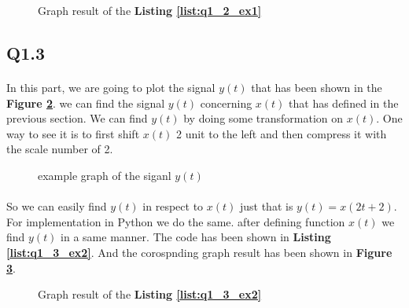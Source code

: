 \begin{figure}[H]
  \centering
  \scalebox{0.4}{}
  \caption{Graph result of the \textbf{Listing \ref{list:q1_2_ex1}}}
  \label{fig:Q1-2-ex1}
\end{figure}

\subsection{Q1.3}

\paragraph{}In this part, we are going to plot the 
signal $y(t)$ that has been shown in the 
\textbf{Figure \ref{fig:ex2}}. we can find the signal 
$y(t)$ concerning $x(t)$ that has defined in the 
previous section. We can find $y(t)$ by doing some 
transformation on $x(t)$. One way to see it is to 
first shift $x(t)$ 2 unit to the left and then 
compress it with the scale number of 2.

\begin{figure}[H]
 \centering
{}
\caption{example graph of the siganl $y(t)$}
  \label{fig:ex2}
\end{figure}
\paragraph{}
So we can easily find $y(t)$ in respect to $x(t)$ 
just that is $y(t) = x(2t+2)$. For implementation 
in Python we do the same. after defining function 
$x(t)$ we find $y(t)$ in a same manner. The code 
has been shown in \textbf{Listing \ref{list:q1_3_ex2}}. And the 
corospnding graph result has been shown in 
\textbf{Figure \ref{fig:Q1-3-ex2}}.

\begin{figure}[H]
  \centering
  \scalebox{0.6}{}
  \caption{Graph result of the \textbf{Listing \ref{list:q1_3_ex2}}}
  \label{fig:Q1-3-ex2}
\end{figure}

